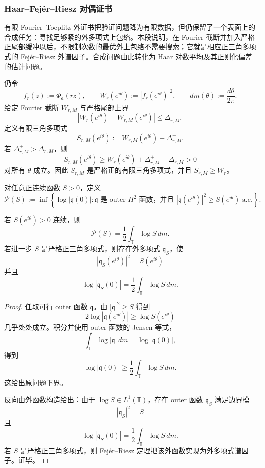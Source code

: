 \subsubsection{Haar--Fej\'er--Riesz 对偶证书}\label{subsubsec:typed-address-biaxial-completion-haar-fejer-riesz-dual-certificate}
有限 Fourier--Toeplitz 外证书把验证问题降为有限数据，但仍保留了一个表面上的合成任务：寻找足够紧的外多项式上包络。本段说明，在 Fourier 截断并加入严格正尾部缓冲以后，不限制次数的最优外上包络不需要搜索；它就是相应正三角多项式的 Fej\'er--Riesz 外谱因子。合成问题由此转化为 Haar 对数平均及其正则化偏差的估计问题。

仍令
\[
f_r(z):=\Phi_a(rz),
\qquad
W_r(e^{i\theta}):=|f_r(e^{i\theta})|^2,
\qquad
dm(\theta):=\frac{d\theta}{2\pi}.
\]
给定 Fourier 截断 \(W_{r,M}\) 与严格尾部上界
\[
\left|W_r(e^{i\theta})-W_{r,M}(e^{i\theta})\right|
\le
\Delta_{r,M}^+,
\]
定义有限三角多项式
\[
S_{r,M}(e^{i\theta})
:=
W_{r,M}(e^{i\theta})+\Delta_{r,M}^+.
\]
若 \(\Delta_{r,M}^+>\Delta_{r,M}\)，则
\[
S_{r,M}(e^{i\theta})
\ge
W_r(e^{i\theta})+\Delta_{r,M}^+-\Delta_{r,M}
>
0
\]
对所有 \(\theta\) 成立。因此 \(S_{r,M}\) 是严格正的有限三角多项式，并且 \(S_{r,M}\ge W_r\)。

\begin{definition}[外上包络原问题]\label{def:typed-address-biaxial-completion-outer-majorant-primal}
对任意正连续函数 \(S>0\)，定义
\[
\mathcal P(S)
:=
\inf
\left\{
\log|\mathfrak q(0)|:
\mathfrak q \text{ 是 outer }H^2\text{ 函数，并且 }
|\mathfrak q(e^{i\theta})|^2\ge S(e^{i\theta})
\text{ a.e.}
\right\}.
\]
\end{definition}

\begin{theorem}\label{thm:typed-address-biaxial-completion-haar-fejer-riesz-duality}
若 \(S(e^{i\theta})>0\) 连续，则
\[
\mathcal P(S)
=
\frac12\int_{\mathbb T}\log S\,dm.
\]
若进一步 \(S\) 是严格正三角多项式，则存在外多项式 \(\mathfrak q_S\)，使
\[
|\mathfrak q_S(e^{i\theta})|^2=S(e^{i\theta})
\]
并且
\[
\log|\mathfrak q_S(0)|
=
\frac12\int_{\mathbb T}\log S\,dm.
\]
\end{theorem}
\begin{proof}
任取可行 outer 函数 \(\mathfrak q\)。由 \(|\mathfrak q|^2\ge S\) 得到
\[
2\log|\mathfrak q(e^{i\theta})|
\ge
\log S(e^{i\theta})
\]
几乎处处成立。积分并使用 outer 函数的 Jensen 等式，
\[
\int_{\mathbb T}\log|\mathfrak q|\,dm
=
\log|\mathfrak q(0)|,
\]
得到
\[
\log|\mathfrak q(0)|
\ge
\frac12\int_{\mathbb T}\log S\,dm.
\]
这给出原问题下界。

反向由外函数构造给出：由于 \(\log S\in L^1(\mathbb T)\)，存在 outer 函数 \(\mathfrak q_S\) 满足边界模
\[
|\mathfrak q_S|^2=S
\]
且
\[
\log|\mathfrak q_S(0)|
=
\frac12\int_{\mathbb T}\log S\,dm.
\]
若 \(S\) 是严格正三角多项式，则 Fej\'er--Riesz 定理把该外函数实现为外多项式谱因子。证毕。
\end{proof}

